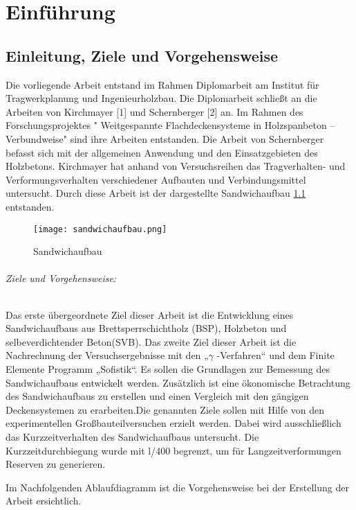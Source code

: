 \documentclass[12 pt,a4 paper ]{scrreprt}
\begin{document}
\tableofcontents
\chapter{Einführung}
\section{Einleitung, Ziele und Vorgehensweise}
 

Die vorliegende Arbeit entstand im Rahmen  Diplomarbeit am Institut für Tragwerkplanung und Ingenieurholzbau. Die Diplomarbeit schließt an die Arbeiten von  Kirchmayer [1] und  Schernberger [2] an. Im Rahmen des Forschungsprojektes " Weitgespannte Flachdeckensysteme in Holzspanbeton – Verbundweise" sind ihre Arbeiten entstanden. Die Arbeit von Schernberger befasst sich mit der allgemeinen Anwendung und den Einsatzgebieten des Holzbetons. Kirchmayer hat anhand von Versuchsreihen das Tragverhalten- und Verformungsverhalten verschiedener Aufbauten und Verbindungsmittel untersucht.  Durch diese Arbeit ist der dargestellte Sandwichaufbau \ref{sandwich} entstanden. 




\begin{figure}[h!]
\begin{center}
\texttt{[image: sandwichaufbau.png]}
\caption{Sandwichaufbau}
\label{sandwich}
\end{center}
\end{figure}

\subparagraph{Ziele und Vorgehensweise:}

Das erste übergeordnete Ziel dieser Arbeit ist die Entwicklung eines Sandwichaufbaus aus Brettsperrschichtholz (BSP), Holzbeton und selbeverdichtender Beton(SVB). Das zweite Ziel dieser Arbeit ist die Nachrechnung der Versuchsergebnisse mit den „$\gamma$ -Verfahren“ und dem Finite Elemente Programm „Sofistik“. Es sollen die Grundlagen zur Bemessung des Sandwichaufbaus entwickelt werden. 
Zusätzlich ist eine ökonomische Betrachtung des Sandwichaufbaus zu erstellen und einen Vergleich mit den gängigen Deckensystemen zu erarbeiten.\newline Die genannten Ziele sollen mit Hilfe von den experimentellen Großbauteilversuchen erzielt werden. Dabei wird ausschließlich das Kurzzeitverhalten des Sandwichaufbaus untersucht. Die Kurzzeitdurchbiegung wurde mit l/400 begrenzt, um für Langzeitverformungen Reserven zu generieren.




\newpage{}
Im Nachfolgenden Ablaufdiagramm ist die Vorgehensweise bei der Erstellung der Arbeit ersichtlich.
\end{document}
